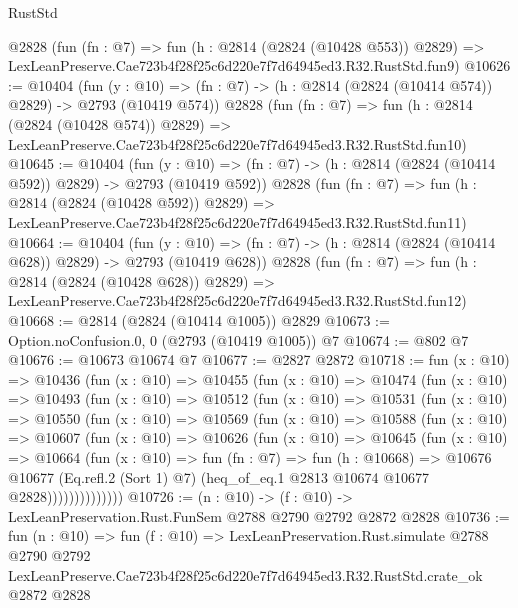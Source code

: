 \begin{lexlean}{RustStd}
\begin{coremodule}
    @2828
    (fun (fn : @7) =>
    fun (h : @2814 (@2824 (@10428 @553)) @2829) =>
    LexLeanPreserve.Cae723b4f28f25c6d220e7f7d64945ed3.R32.RustStd.fun9)
@10626 := @10404
    (fun (y : @10) => (fn : @7) -> (h : @2814 (@2824 (@10414 @574)) @2829) -> @2793 (@10419 @574))
    @2828
    (fun (fn : @7) =>
    fun (h : @2814 (@2824 (@10428 @574)) @2829) =>
    LexLeanPreserve.Cae723b4f28f25c6d220e7f7d64945ed3.R32.RustStd.fun10)
@10645 := @10404
    (fun (y : @10) => (fn : @7) -> (h : @2814 (@2824 (@10414 @592)) @2829) -> @2793 (@10419 @592))
    @2828
    (fun (fn : @7) =>
    fun (h : @2814 (@2824 (@10428 @592)) @2829) =>
    LexLeanPreserve.Cae723b4f28f25c6d220e7f7d64945ed3.R32.RustStd.fun11)
@10664 := @10404
    (fun (y : @10) => (fn : @7) -> (h : @2814 (@2824 (@10414 @628)) @2829) -> @2793 (@10419 @628))
    @2828
    (fun (fn : @7) =>
    fun (h : @2814 (@2824 (@10428 @628)) @2829) =>
    LexLeanPreserve.Cae723b4f28f25c6d220e7f7d64945ed3.R32.RustStd.fun12)
@10668 := @2814 (@2824 (@10414 @1005)) @2829
@10673 := Option.noConfusion.{0, 0} (@2793 (@10419 @1005)) @7
@10674 := @802 @7
@10676 := @10673 @10674 @7
@10677 := @2827 @2872
@10718 := fun (x : @10) =>
  @10436
    (fun (x : @10) =>
    @10455
      (fun (x : @10) =>
      @10474
        (fun (x : @10) =>
        @10493
          (fun (x : @10) =>
          @10512
            (fun (x : @10) =>
            @10531
              (fun (x : @10) =>
              @10550
                (fun (x : @10) =>
                @10569
                  (fun (x : @10) =>
                  @10588
                    (fun (x : @10) =>
                    @10607
                      (fun (x : @10) =>
                      @10626
                        (fun (x : @10) =>
                        @10645
                          (fun (x : @10) =>
                          @10664
                            (fun (x : @10) =>
                            fun (fn : @7) =>
                            fun (h : @10668) =>
                            @10676
                              @10677
                              (Eq.refl.{2} (Sort 1) @7)
                              (heq_of_eq.{1} @2813 @10674 @10677 @2828))))))))))))))
@10726 := (n : @10) -> (f : @10) -> LexLeanPreservation.Rust.FunSem @2788 @2790 @2792 @2872 @2828
@10736 := fun (n : @10) =>
  fun (f : @10) =>
  LexLeanPreservation.Rust.simulate
    @2788
    @2790
    @2792
    LexLeanPreserve.Cae723b4f28f25c6d220e7f7d64945ed3.R32.RustStd.crate_ok
    @2872
    @2828
\end{coremodule}
\end{lexlean}
